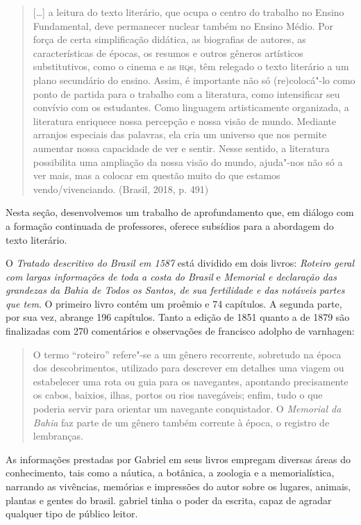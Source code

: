 \documentclass[12pt]{extarticle}
\begin{document}
\begin{quote}
{[}\ldots{}{]} a leitura do texto literário, que ocupa o centro do trabalho
no Ensino Fundamental, deve permanecer nuclear também no Ensino Médio.
Por força de certa simplificação didática, as biografias de autores, as
características de épocas, os resumos e outros gêneros artísticos
substitutivos, como o cinema e as \textsc{hq}s, têm relegado o texto literário a
um plano secundário do ensino. Assim, é importante não só (re)colocá"-lo
como ponto de partida para o trabalho com a literatura, como
intensificar seu convívio com os estudantes. Como linguagem
artisticamente organizada, a literatura enriquece nossa percepção e
nossa visão de mundo. Mediante arranjos especiais das palavras, ela cria
um universo que nos permite aumentar nossa capacidade de ver e sentir.
Nesse sentido, a literatura possibilita uma ampliação da nossa visão do
mundo, ajuda"-nos não só a ver mais, mas a colocar em questão muito do
que estamos vendo/vivenciando. (Brasil, 2018, p. 491)
\end{quote}

Nesta seção, desenvolvemos um trabalho de aprofundamento que, em diálogo
com a formação continuada de professores, oferece subsídios para a
abordagem do texto literário.

O \textit{Tratado descritivo do Brasil em 1587} está dividido em dois livros:
\textit{Roteiro geral com largas informações de toda a costa do Brasil} e
\textit{Memorial e declaração das grandezas da Bahia de Todos os Santos, de sua
fertilidade e das notáveis partes que tem}. O primeiro livro contém um
proêmio e 74 capítulos. A segunda parte, por sua vez, abrange 196
capítulos. Tanto a edição de 1851 quanto a de 1879 são finalizadas com
270 comentários e observações de francisco adolpho de varnhagen:

\begin{quote}
O termo ``roteiro'' refere"-se a um gênero recorrente, sobretudo na época
dos descobrimentos, utilizado para descrever em detalhes uma viagem ou
estabelecer uma rota ou guia para os navegantes, apontando precisamente
os cabos, baixios, ilhas, portos ou rios navegáveis; enfim, tudo o que
poderia servir para orientar um navegante conquistador. O \textit{Memorial da
Bahia} faz parte de um gênero também corrente à época, o registro de
lembranças.
\end{quote}

As informações prestadas por Gabriel em seus livros empregam diversas
áreas do conhecimento, tais como a náutica, a botânica, a zoologia e a
memorialística, narrando as vivências, memórias e impressões do autor
sobre os lugares, animais, plantas e gentes do brasil. gabriel tinha o
poder da escrita, capaz de agradar qualquer tipo de público leitor.
\end{document}
